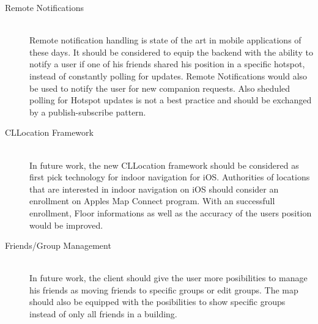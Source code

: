 \begin{description}
  \item[Remote Notifications] \hfill \\
  Remote notification handling is state of the art in mobile applications of these days. It should be considered to equip the backend with the ability to notify a user if one of his friends shared his position in a specific hotspot, instead of constantly polling for updates. Remote Notifications would also be used to notify the user for new companion requests. Also sheduled polling for Hotspot updates is not a best practice and should be exchanged by a publish-subscribe pattern.
  \item[CLLocation Framework] \hfill \\
  In future work, the new CLLocation framework should be considered as first pick technology for indoor navigation for iOS. Authorities of locations that are interested in indoor navigation on iOS should consider an enrollment on Apples Map Connect program. With an successfull enrollment, Floor informations as well as the accuracy of the users position would be improved.
  \item[Friends/Group Management] \hfill \\
  In future work, the client should give the user more posibilities to manage his friends as moving friends to specific groups or edit groups. The map should also be equipped with the posibilities to show specific groups instead of only all friends in a building.
  
\end{description}